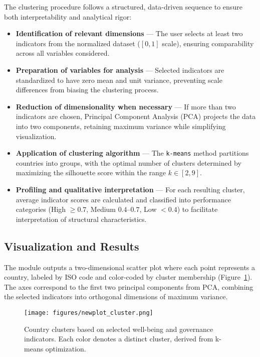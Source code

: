 \documentclass[11pt]{article}
\begin{document}
\noindent
The clustering procedure follows a structured, data-driven sequence to ensure both interpretability and analytical rigor:
\begin{itemize}
    \item \textbf{Identification of relevant dimensions} — The user selects at least two indicators from the normalized dataset ($[0,1]$ scale), ensuring comparability across all variables considered.
    \item \textbf{Preparation of variables for analysis} — Selected indicators are standardized to have zero mean and unit variance, preventing scale differences from biasing the clustering process.
    \item \textbf{Reduction of dimensionality when necessary} — If more than two indicators are chosen, Principal Component Analysis (PCA) projects the data into two components, retaining maximum variance while simplifying visualization.
    \item \textbf{Application of clustering algorithm} — The \texttt{k-means} method partitions countries into groups, with the optimal number of clusters determined by maximizing the silhouette score within the range $k \in [2, 9]$.
    \item \textbf{Profiling and qualitative interpretation} — For each resulting cluster, average indicator scores are calculated and classified into performance categories (High $\geq 0.7$, Medium $0.4$–$0.7$, Low $<0.4$) to facilitate interpretation of structural characteristics.
\end{itemize}



\subsection{Visualization and Results}
\noindent
The module outputs a two-dimensional scatter plot where each point represents a country, labeled by ISO code and color-coded by cluster membership (Figure~\ref{fig:clustering}). The axes correspond to the first two principal components from PCA, combining the selected indicators into orthogonal dimensions of maximum variance.

\begin{figure}[H]
\centering
\texttt{[image: figures/newplot\_cluster.png]}
\caption{Country clusters based on selected well-being and governance indicators. Each color denotes a distinct cluster, derived from k-means optimization.}
\label{fig:clustering}
\end{figure}
\end{document}
